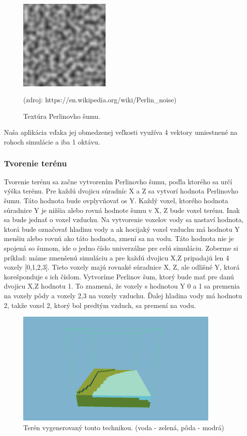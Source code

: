 \documentclass[12pt]{article}
\begin{document}
\begin{figure}[ht]
	\centering
	\includegraphics[width=0.4\textwidth]{res/perlinov_sum_textura.png}
	\caption{Textúra Perlinovho šumu.}
	\footnotesize (zdroj: https://en.wikipedia.org/wiki/Perlin\_noise)
	\label{obr:perlinov sum textura}
\end{figure}

Naša aplikácia vďaka jej obmedzenej veľkosti využíva 4 vektory umiestnené
na rohoch simulácie a iba 1 oktávu.

\subsubsection{Tvorenie terénu}

Tvorenie terénu sa začne vytvorením Perlinovho šumu, poďla ktorého sa určí výška terénu.
Pre každú dvojicu súradníc X a Z sa vytvorí hodnota Perlinovho šumu. Táto hodnota
bude ovplyvňovať os Y. Každý voxel, ktorého hodnota súradnice Y je nižšia alebo
rovná hodnote šumu v X, Z bude voxel terénu. Inak sa bude jednať o voxel
vzduchu. Na vytvorenie voxelov vody sa nastaví hodnota, ktorá bude označovať
hladinu vody a ak hocijaký voxel vzduchu má hodnotu Y menšiu alebo rovnú ako táto
hodnota, zmení sa na vodu. Táto hodnota nie je spojená so šumom, ide o jedno
číslo univerzálne pre celú simuláciu. Zoberme si príklad: máme zmenšenú
simuláciu a pre každú dvojicu X,Z pripadajú len 4 voxely [0,1,2,3]. Tieto voxely
majú rovnaké súradnice X, Z, ale odlišné Y, ktorá korešponduje s ich číslom.
Vytvoríme Perlinov šum, ktorý bude mať pre danú dvojicu X,Z hodnotu 1. To
znamená, že voxely s hodnotou Y 0 a 1 sa premenia na voxely pôdy a voxely 2,3
na voxely vzduchu. Ďalej hladina vody má hodnotu 2, takže voxel 2, ktorý bol
predtým vzduch, sa premení na vodu.

\begin{figure}[ht]
	\centering
	\includegraphics[width=0.9\textwidth]{res/terrain.png}
	\caption{Terén vygenerovaný touto technikou. (voda - zelená, pôda - modrá)}
\end{figure}
\end{document}
